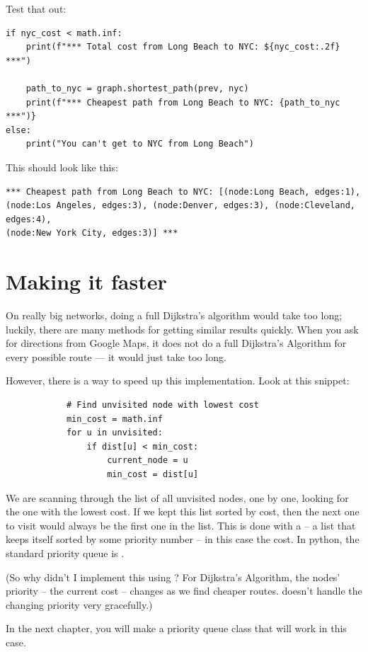 Test that out:

\begin{verbatim}
if nyc_cost < math.inf:
    print(f"*** Total cost from Long Beach to NYC: ${nyc_cost:.2f} ***")

    path_to_nyc = graph.shortest_path(prev, nyc)
    print(f"*** Cheapest path from Long Beach to NYC: {path_to_nyc ***")}
else:
    print("You can't get to NYC from Long Beach")
\end{verbatim}

This should look like this:
\begin{verbatim}
*** Cheapest path from Long Beach to NYC: [(node:Long Beach, edges:1),
(node:Los Angeles, edges:3), (node:Denver, edges:3), (node:Cleveland, edges:4),
(node:New York City, edges:3)] ***
\end{verbatim}

\section{Making it faster}

On really big networks, doing a full Dijkstra's algorithm would take
too long; luckily, there are many methods for getting similar results
quickly.  When you ask for directions from Google Maps, it does not do
a full Dijkstra's Algorithm for every possible route --- it would just
take too long.

However, there is a way to speed up this implementation. Look at this snippet:

\begin{verbatim}
            # Find unvisited node with lowest cost
            min_cost = math.inf
            for u in unvisited:
                if dist[u] < min_cost:
                    current_node = u
                    min_cost = dist[u]
\end{verbatim}

We are scanning through the list of all unvisited nodes, one by one,
looking for the one with the lowest cost.  If we kept this list sorted
by cost, then the next one to visit would always be the first one in
the list. This is done with a  -- a list that
keeps itself sorted by some priority number -- in this case the
cost. In python, the standard priority queue is .

(So why didn't I implement this using ? For Dijkstra's
Algorithm, the nodes' priority -- the current cost --  changes as we find
cheaper routes.  doesn't handle the changing priority
very gracefully.)

In the next chapter, you will make a priority queue class that will
work in this case.
